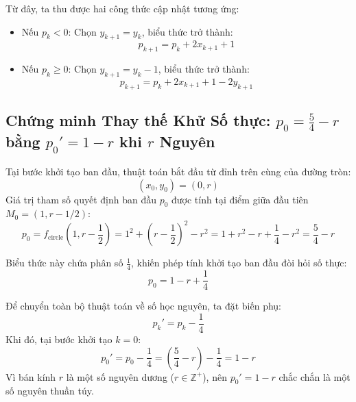 Từ đây, ta thu được hai công thức cập nhật tương ứng:
\begin{itemize}
    \item Nếu $p_k < 0$: Chọn $y_{k+1} = y_k$, biểu thức trở thành:
    \begin{equation}
    p_{k+1} = p_k + 2x_{k+1} + 1
    \end{equation}
    \item Nếu $p_k \ge 0$: Chọn $y_{k+1} = y_k - 1$, biểu thức trở thành:
    \begin{equation}
    p_{k+1} = p_k + 2x_{k+1} + 1 - 2y_{k+1}
    \end{equation}
\end{itemize}

\subsection{Chứng minh Thay thế Khử Số thực: \texorpdfstring{$p_0 = \frac{5}{4} - r$}{p0 = 5/4 - r} bằng \texorpdfstring{$p_0' = 1 - r$}{p0' = 1 - r} khi \texorpdfstring{$r$}{r} Nguyên}
\label{subsec:w4_circle_p0}

Tại bước khởi tạo ban đầu, thuật toán bắt đầu từ đỉnh trên cùng của đường tròn:
\begin{equation}
(x_0, y_0) = (0, r)
\end{equation}
Giá trị tham số quyết định ban đầu $p_0$ được tính tại điểm giữa đầu tiên $M_0 = (1, r - 1/2)$:
\begin{equation}
p_0 = f_{\text{circle}}\left(1, r - \frac{1}{2}\right) = 1^2 + \left(r - \frac{1}{2}\right)^2 - r^2 = 1 + r^2 - r + \frac{1}{4} - r^2 = \frac{5}{4} - r
\end{equation}

Biểu thức này chứa phân số $\frac{1}{4}$, khiến phép tính khởi tạo ban đầu đòi hỏi số thực:
\begin{equation}
p_0 = 1 - r + \frac{1}{4}
\end{equation}

Để chuyển toàn bộ thuật toán về số học nguyên, ta đặt biến phụ:
\begin{equation}
p_k' = p_k - \frac{1}{4}
\end{equation}
Khi đó, tại bước khởi tạo $k = 0$:
\begin{equation}
p_0' = p_0 - \frac{1}{4} = \left( \frac{5}{4} - r \right) - \frac{1}{4} = 1 - r
\end{equation}
Vì bán kính $r$ là một số nguyên dương ($r \in \mathbb{Z}^+$), nên $p_0' = 1 - r$ chắc chắn là một số nguyên thuần túy.

